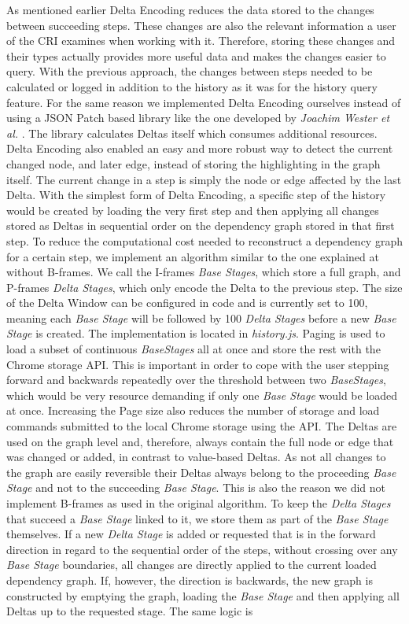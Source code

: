 As mentioned earlier Delta Encoding reduces the data stored to the changes between succeeding steps. These changes are also the relevant information a user of the CRI examines when working with it. Therefore, storing these changes and their types actually provides more useful data and makes the changes easier to query. With the previous approach, the changes between steps needed to be calculated or logged in addition to the history as it was for the history query feature. For the same reason we implemented Delta Encoding ourselves instead of using a JSON Patch \cite{JSONPatch} based library like the one developed by \emph{Joachim Wester et al.} \cite{JSONPatchImplementation}. The library calculates Deltas itself which consumes additional resources. Delta Encoding also enabled an easy and more robust way to detect the current changed node, and later edge, instead of storing the highlighting in the graph itself. The current change in a step is simply the node or edge affected by the last Delta. With the simplest form of Delta Encoding, a specific step of the history would be created by loading the very first step and then applying all changes stored as Deltas in sequential order on the dependency graph stored in that first step. To reduce the computational cost needed to reconstruct a dependency graph for a certain step, we implement an algorithm similar to the one explained at \cite{VideoEncoding} without B-frames. We call the I-frames \emph{Base Stages}, which store a full graph, and P-frames \emph{Delta Stages}, which only encode the Delta to the previous step. The size of the Delta Window can be configured in code and is currently set to 100, meaning each \emph{Base Stage} will be followed by 100 \emph{Delta Stages} before a new \emph{Base Stage} is created. The implementation is located in \emph{history.js}. Paging is used to load a subset of continuous \emph{BaseStages} all at once and store the rest with the Chrome storage API. This is important in order to cope with the user stepping forward and backwards repeatedly over the threshold between two \emph{BaseStages}, which would be very resource demanding if only one \emph{Base Stage} would be loaded at once. Increasing the Page size also reduces the number of storage and load commands submitted to the local Chrome storage using the API. The Deltas are used on the graph level and, therefore, always contain the full node or edge that was changed or added, in contrast to value-based Deltas. As not all changes to the graph are easily reversible their Deltas always belong to the proceeding \emph{Base Stage} and not to the succeeding \emph{Base Stage}. This is also the reason we did not implement B-frames as used in the original algorithm. To keep the \emph{Delta Stages} that succeed a \emph{Base Stage} linked to it, we store them as part of the \emph{Base Stage} themselves. If a new \emph{Delta Stage} is added or requested that is in the forward direction in regard to the sequential order of the steps, without crossing over any \emph{Base Stage} boundaries, all changes are directly applied to the current loaded dependency graph. If, however, the direction is backwards, the new graph is constructed by emptying the graph, loading the \emph{Base Stage} and then applying all Deltas up to the requested stage. The same logic is 